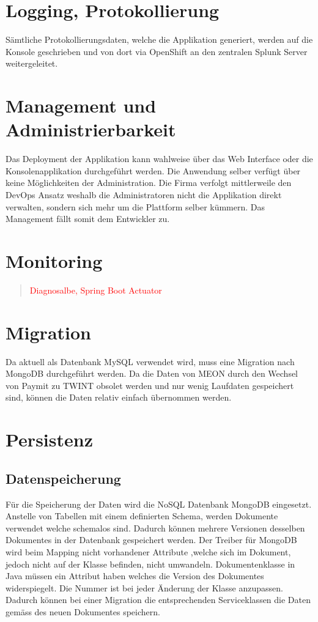\section{Logging, Protokollierung}

Sämtliche Protokollierungsdaten, welche die Applikation generiert, werden auf die Konsole geschrieben und von dort via OpenShift an den zentralen Splunk Server weitergeleitet.

\section{Management und Administrierbarkeit}

Das Deployment der Applikation kann wahlweise über das Web Interface oder die Konsolenapplikation durchgeführt werden. Die Anwendung selber verfügt über keine Möglichkeiten der Administration. Die Firma verfolgt mittlerweile den DevOps Ansatz weshalb die Administratoren nicht die Applikation direkt verwalten, sondern sich mehr um die Plattform selber kümmern.  Das Management fällt somit dem Entwickler zu. 

\section{Monitoring}

\begin{quote}
	\textcolor{red}{Diagnosalbe, Spring Boot Actuator}
\end{quote}

\section{Migration}

Da aktuell als Datenbank MySQL verwendet wird, muss eine Migration nach MongoDB durchgeführt werden. Da die Daten von MEON durch den Wechsel von Paymit zu TWINT
obsolet werden und nur wenig Laufdaten gespeichert sind, können die Daten relativ einfach übernommen werden.

\section{Persistenz}
\label{persistenz}

\subsection{Datenspeicherung}
Für die Speicherung der Daten wird die NoSQL Datenbank MongoDB eingesetzt. Anstelle von Tabellen mit einem definierten Schema, werden Dokumente verwendet welche schemalos sind. Dadurch können mehrere Versionen desselben Dokumentes in der Datenbank gespeichert werden. Der Treiber für MongoDB wird beim Mapping nicht vorhandener Attribute ,welche sich im Dokument, jedoch nicht auf der Klasse befinden, nicht umwandeln.\newline
Dokumentenklasse in Java müssen ein Attribut haben welches die Version des Dokumentes widerspiegelt. Die Nummer ist bei jeder Änderung der Klasse anzupassen. Dadurch können bei einer Migration die entsprechenden Serviceklassen die Daten gemäss des neuen Dokumentes speichern.

